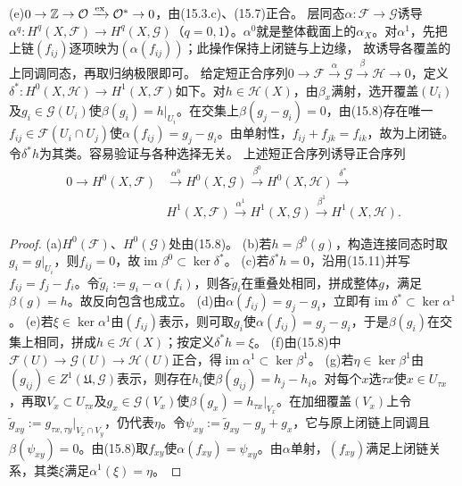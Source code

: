 (e)$0\to\mathbb Z\to\mathcal O\xrightarrow{\mathrm{ex}}\mathcal O^*\to0$，由(15.3.c)、(15.7)正合。
层同态$\alpha:\mathcal F\to\mathcal G$诱导$\alpha^q:H^q(X,\mathcal F)\to H^q(X,\mathcal G)$（$q=0,1$）。$\alpha^0$就是整体截面上的$\alpha_X$。对$\alpha^1$，先把上链$(f_{ij})$逐项映为$(\alpha(f_{ij}))$；此操作保持上闭链与上边缘，
故诱导各覆盖的上同调同态，再取归纳极限即可。
给定短正合序列$0\to\mathcal F\xrightarrow\alpha\mathcal G\xrightarrow\beta\mathcal H\to0$，定义$\delta^*:H^0(X,\mathcal H)\to H^1(X,\mathcal F)$如下。对$h\in\mathcal H(X)$，由$\beta_x$满射，选开覆盖$(U_i)$及$g_i\in\mathcal G(U_i)$使$\beta(g_i)=h|_{U_i}$。在交集上$\beta(g_j-g_i)=0$，由(15.8)存在唯一$f_{ij}\in\mathcal F(U_i\cap U_j)$使$\alpha(f_{ij})=g_j-g_i$。由单射性，$f_{ij}+f_{jk}=f_{ik}$，故为上闭链。令$\delta^*h$为其类。容易验证与各种选择无关。
上述短正合序列诱导正合序列
\[
\begin{aligned}
0\to H^0(X,\mathcal F)&\xrightarrow{\alpha^0}H^0(X,\mathcal G)\xrightarrow{\beta^0}H^0(X,\mathcal H)\xrightarrow{\delta^*}\\
& H^1(X,\mathcal F)\xrightarrow{\alpha^1}H^1(X,\mathcal G)\xrightarrow{\beta^1}H^1(X,\mathcal H).
\end{aligned}
\]
\begin{proof}
(a)$H^0(\mathcal F)$、$H^0(\mathcal G)$处由(15.8)。
(b)若$h=\beta^0(g)$，构造连接同态时取$g_i=g|_{U_i}$，则$f_{ij}=0$，故$\operatorname{im}\beta^0\subset\ker\delta^*$。
(c)若$\delta^*h=0$，沿用(15.11)并写$f_{ij}=f_j-f_i$。令$\widetilde g_i:=g_i-\alpha(f_i)$，则各$\widetilde g_i$在重叠处相同，拼成整体$g$，满足$\beta(g)=h$。故反向包含也成立。
(d)由$\alpha(f_{ij})=g_j-g_i$，立即有$\operatorname{im}\delta^*\subset\ker\alpha^1$。
(e)若$\xi\in\ker\alpha^1$由$(f_{ij})$表示，则可取$g_i$使$\alpha(f_{ij})=g_j-g_i$，于是$\beta(g_i)$在交集上相同，拼成$h\in\mathcal H(X)$；按定义$\delta^*h=\xi$。
(f)由(15.8)中$\mathcal F(U)\to\mathcal G(U)\to\mathcal H(U)$正合，得$\operatorname{im}\alpha^1\subset\ker\beta^1$。
(g)若$\eta\in\ker\beta^1$由$(g_{ij})\in Z^1(\mathfrak U,\mathcal G)$表示，则存在$h_i$使$\beta(g_{ij})=h_j-h_i$。对每个$x$选$\tau x$使$x\in U_{\tau x}$，再取$V_x\subset U_{\tau x}$及$g_x\in\mathcal G(V_x)$使$\beta(g_x)=h_{\tau x}|_{V_x}$。在加细覆盖$(V_x)$上令$\widetilde g_{xy}:=g_{\tau x,\tau y}|_{V_x\cap V_y}$，仍代表$\eta$。令$\psi_{xy}:=\widetilde g_{xy}-g_y+g_x$，它与原上闭链上同调且$\beta(\psi_{xy})=0$。由(15.8)取$f_{xy}$使$\alpha(f_{xy})=\psi_{xy}$。由$\alpha$单射，$(f_{xy})$满足上闭链关系，其类$\xi$满足$\alpha^1(\xi)=\eta$。
\end{proof}
